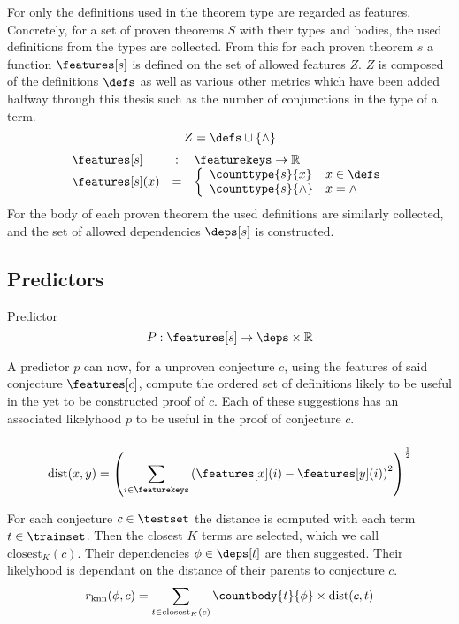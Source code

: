 For \roerei only the definitions used in the theorem type are regarded as features.
Concretely, for a set of proven theorems $S$ with their types and bodies, the used definitions from the types are collected.
From this for each proven theorem $s$ a function $\features[s]$ is defined on the set of allowed features $Z$.
$Z$ is composed of the definitions $\defs$ as well as various other metrics which have been added halfway through this thesis such as the number of conjunctions in the type of a term.
$$ Z = \defs \cup \{ \wedge \} $$
$$
\begin{array}{lcl}
	\features[s] & : & \featurekeys \rightarrow \mathbb{R} \\
	\features[s](x) & = & \left\{
		\begin{array}{ll}
			\counttype{s}{x} & x \in \defs \\
			\counttype{s}{\wedge} & x = \wedge
		\end{array} \right.
\end{array}
$$
For the body of each proven theorem the used definitions are similarly collected, and the set of allowed dependencies $\deps[s]$ is constructed.

\subsection{Predictors}

\begin{definition}{Predictor}
	\[ P : \features[s] \rightarrow \deps \times \mathbb{R} \]
\end{definition}

A predictor $p$ can now, for a unproven conjecture $c$,
using the features of said conjecture $\features[c]$,
compute the ordered set of definitions likely to be useful in the yet to be constructed proof of $c$.
Each of these suggestions has an associated likelyhood $p$ to be useful in the proof of conjecture $c$.

\subsubsection{\knn}
$$ \text{dist}(x, y) = \left( \sum_{i \in \featurekeys} \left( \features[x](i) - \features[y](i) \right)^2 \right)^{\frac{1}{2}} $$

For each conjecture $c \in \testset$ the distance is computed with each term $t \in \trainset$.
Then the closest $K$ terms are selected, which we call $\text{closest}_K(c)$.
Their dependencies $\phi \in \deps[t]$ are then suggested.
Their likelyhood is dependant on the distance of their parents to conjecture $c$.
\[ r_\text{knn}(\phi, c) = \sum_{t \in \text{closest}_K(c)} \countbody{t}{\phi} \times \text{dist}(c, t) \]

